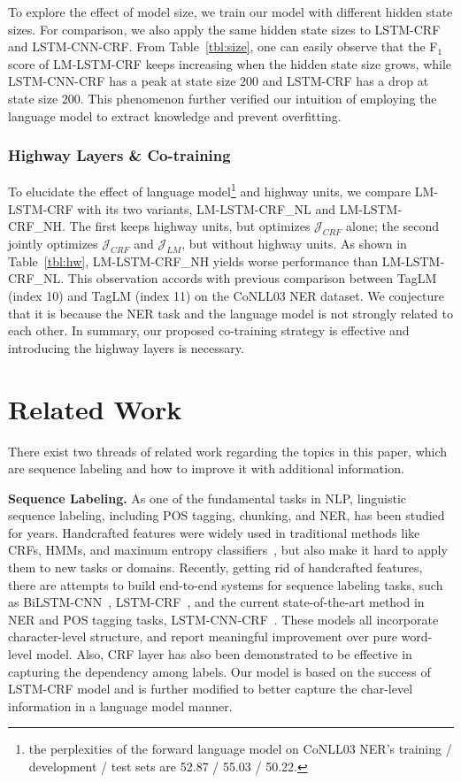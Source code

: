 \documentclass[letterpaper]{article} \usepackage{aaai18}  \usepackage{times}  \usepackage{helvet}  \usepackage{courier}  \usepackage{url}  \usepackage{graphicx}  \usepackage{multirow}
\newcommand{\our}{\textsc{LM-LSTM-CRF}\xspace}
\newcommand{\ournl}{\textsc{LM-LSTM-CRF\_NL}\xspace}
\newcommand{\ournh}{\textsc{LM-LSTM-CRF\_NH}\xspace}
\begin{document}
    To explore the effect of model size, we train our model with different hidden state sizes.
    For comparison, we also apply the same hidden state sizes to LSTM-CRF and LSTM-CNN-CRF.
    From Table~\ref{tbl:size}, one can easily observe that the F$_1$ score of \our keeps increasing when the hidden state size grows, while LSTM-CNN-CRF has a peak at state size $200$ and LSTM-CRF has a drop at state size $200$. 
    This phenomenon further verified our intuition of employing the language model to extract knowledge and prevent overfitting.

    \subsubsection{Highway Layers \& Co-training}

    To elucidate the effect of language model\footnote{the perplexities of the forward language model on CoNLL03 NER's training / development / test sets are 52.87 / 55.03 / 50.22.} and highway units, we compare \our with its two variants, \ournl and \ournh.
    The first keeps highway units, but optimizes $\mathcal{J}_{CRF}$ alone; the second jointly optimizes $\mathcal{J}_{CRF}$ and $\mathcal{J}_{LM}$, but without highway units.
    As shown in Table~\ref{tbl:hw}, \ournh yields worse performance than \ournl.
    This observation accords with previous comparison between TagLM (index 10) and TagLM (index 11) on the CoNLL03 NER dataset.
    We conjecture that it is because the NER task and the language model is not strongly related to each other.
    In summary, our proposed co-training strategy is effective and introducing the highway layers is necessary. 

\section{Related Work}
\label{sect:rel}

There exist two threads of related work regarding the topics in this paper, which are sequence labeling and how to improve it with additional information. 

\noindent\textbf{Sequence Labeling.}
As one of the fundamental tasks in NLP, linguistic sequence labeling, including POS tagging, chunking, and NER, has been studied for years.
Handcrafted features were widely used in traditional methods like CRFs, HMMs, and maximum entropy classifiers~\cite{Lafferty2001ConditionalRF,McCallum2003EarlyRF,Florian2003NamedER,Chieu2002NamedER}, but also make it hard to apply them to new tasks or domains.
Recently, getting rid of handcrafted features, there are attempts to build end-to-end systems for sequence labeling tasks, such as BiLSTM-CNN~\cite{Chiu2016NamedER}, LSTM-CRF~\cite{2016naacl}, and the current state-of-the-art method in NER and POS tagging tasks, LSTM-CNN-CRF~\cite{ma-hovy:2016:P16-1}.
These models all incorporate character-level structure, and report meaningful improvement over pure word-level model.
Also, CRF layer has also been demonstrated to be effective in capturing the dependency among labels.
Our model is based on the success of LSTM-CRF model and is further modified to better capture the char-level information in a language model manner.
\end{document}
